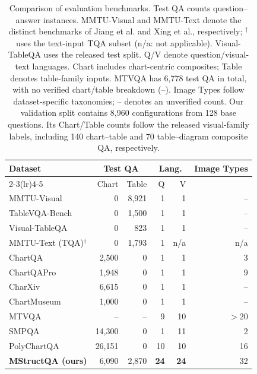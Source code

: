 \begin{table}[t]
\centering
\scriptsize
\setlength{\tabcolsep}{2pt}
\renewcommand{\arraystretch}{1.12}
\begin{tabular*}{\columnwidth}{@{\extracolsep{\fill}}lrrrrr@{}}
\toprule
\textbf{Dataset} & \multicolumn{2}{c}{\textbf{Test QA}} &
\multicolumn{2}{c}{\textbf{Lang.}} & \textbf{Image Types} \\
\cmidrule(lr){2-3}\cmidrule(lr){4-5}
& Chart & Table & Q & V & \\
\midrule
MMTU-Visual  & 0 & 8,921 & 1 & 1 & -- \\
TableVQA-Bench  & 0 & 1,500 & 1 & 1 & -- \\
Visual-TableQA  & 0 & 823 & 1 & 1 & -- \\
MMTU-Text (TQA)$^{\dagger}$  & 0 & 1,793 & 1 & n/a & n/a \\
ChartQA  & 2,500 & 0 & 1 & 1 & 3 \\
ChartQAPro  & 1,948 & 0 & 1 & 1 & 9 \\
CharXiv  & 6,615 & 0 & 1 & 1 & -- \\
ChartMuseum  & 1,000 & 0 & 1 & 1 & -- \\
\midrule
MTVQA  & -- & -- & 9 & 10 & $>20$ \\
SMPQA  & 14,300 & 0 & 1 & 11 & 2 \\
PolyChartQA  & 26,151 & 0 & 10 & 10 & 16 \\
\midrule
\textbf{MStructQA (ours)} & 6,090 & 2,870 & \textbf{24} & \textbf{24} & 32 \\
\bottomrule
\end{tabular*}
\caption{Comparison of evaluation benchmarks. Test QA counts
question--answer instances. MMTU-Visual and MMTU-Text denote the
distinct benchmarks of Jiang et al. and Xing et al., respectively;
$^{\dagger}$uses the text-input TQA subset (n/a: not applicable).
Visual-TableQA uses the released test split. Q/V denote question/visual-text languages.
Chart includes chart-centric composites; Table denotes table-family inputs.
MTVQA has 6,778 test QA in total, with no verified chart/table breakdown
(--). Image Types follow dataset-specific taxonomies; -- denotes an
unverified count. Our validation split contains 8,960 configurations from
128 base questions. Its Chart/Table counts follow the released visual-family
labels, including 140 chart--table and 70 table--diagram composite QA,
respectively.}
\label{tab:benchmark-comparison}
\end{table}
